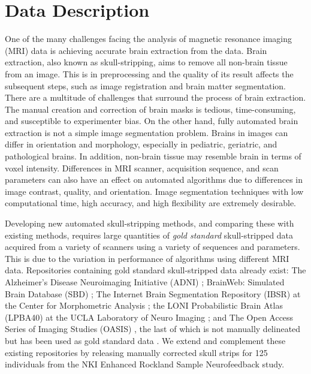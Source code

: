 \section*{Data Description}

\par One of the many challenges facing the analysis of magnetic resonance imaging (MRI) data is achieving accurate brain extraction from the data. Brain extraction, also known as skull-stripping, aims to remove all non-brain tissue from an image. This is \DIFdelbegin {}\DIFdelend \DIFaddbegin {}\DIFaddend in preprocessing and the quality of its result affects the subsequent steps, such as image registration and brain matter segmentation. There are a multitude of challenges that surround the process of brain extraction. The manual creation and correction of brain masks is tedious, time-consuming, and susceptible to experimenter bias. On the other hand, fully automated brain extraction is not a simple image segmentation problem. Brains in images can differ in orientation and morphology, especially in pediatric, geriatric, and pathological brains. In addition, non-brain tissue may resemble brain in terms of voxel intensity. Differences in MRI scanner, acquisition sequence, and scan parameters can also have an effect on automated algorithms due to differences in image contrast, quality, and orientation. Image segmentation techniques with low computational time, high accuracy, and high flexibility are extremely desirable.
\par Developing new automated skull-stripping methods, and comparing these with existing methods, requires large quantities of \emph{gold standard} skull-stripped data acquired from a variety of scanners using a variety of sequences and parameters. This is due to the variation in performance of algorithms using different MRI data. Repositories containing gold standard skull-stripped data already exist: The Alzheimer's Disease Neuroimaging Initiative (ADNI) \cite{pmid17476317}; BrainWeb: Simulated Brain Database (SBD) \cite{brainweb}; The Internet Brain Segmentation Repository (IBSR) at the Center for Morphometric Analysis \cite{IBSR}; the LONI Probabilistic Brain Atlas (LPBA40) at the UCLA Laboratory of Neuro Imaging \cite{lpba40}; and The Open Access Series of Imaging Studies (OASIS) \cite{oasis}, the last of which is not manually delineated but has been used as gold standard data \cite{Iglesias2011, MASS}. We extend and complement these existing repositories by releasing manually corrected skull strips for 125 individuals from the NKI Enhanced Rockland Sample Neurofeedback study. \DIFaddbegin {}\DIFaddend 

